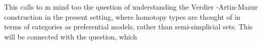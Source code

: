 This calls to m mind too the question of understanding the Verdier
-Artin-Mazur construction in the present setting, where homotopy types
are thought of in terms of categories as preferential models, rather than
semi-simplicial sets. This will be connected with the question, which
